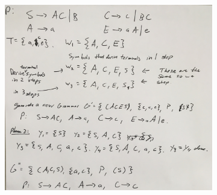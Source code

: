 \documentclass[20pt]{article} %
\begin{document}
\begin{figure}[!htbp]
  	\centering
   	\begin{subfigure}[p]{1.0\linewidth}
    	\includegraphics[width=\linewidth]{./figures/f-2.jpg}
   	\end{subfigure}
\end{figure}
\end{document}

